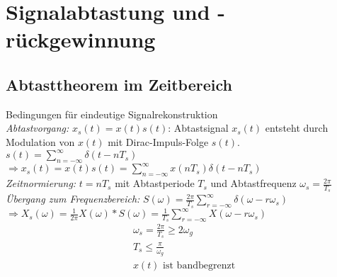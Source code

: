 \documentclass[german]{latex4ei/latex4ei_sheet}
\begin{document}
\section{Signalabtastung und -rückgewinnung}
\begin{sectionbox}
	\subsection{Abtasttheorem im Zeitbereich}
	Bedingungen für eindeutige Signalrekonstruktion\\
	\emph{Abtastvorgang:} \underline{$x_s(t) = x(t) s(t)$}: Abtastsignal $x_s(t)$ entsteht durch Modulation von $x(t)$ mit Dirac-Impuls-Folge $s(t)$.\\
	$s(t) = \sum\limits_{n=-\infty}^{\infty}{\delta(t - n T_s)}$\\
	$\Rightarrow x_s(t) = x(t) s(t) = \sum\limits_{n=-\infty}^{\infty}{x(n T_s) \delta(t - n T_s)}$\\
	\emph{Zeitnormierung:} $t = n T_s$ mit Abtastperiode $T_s$ und Abtastfrequenz $\omega_s = \frac{2 \pi}{T_s}$\\
	\emph{Übergang zum Frequenzbereich:} $S(\omega) = \frac{2 \pi}{T_s} \sum\limits_{r=-\infty}^{\infty}{\delta(\omega
	 - r \omega_s)}$\\
	$\Rightarrow X_s(\omega) = \frac{1}{2 \pi} X(\omega) \ast S(\omega) = \frac{1}{T_s} \sum\limits_{r=-\infty}^{\infty}{X(\omega - r \omega_s)}$
	\begin{align}
		\omega_s = \frac{2 \pi}{T_s} \geq 2 \omega_g\\
		T_s \leq \frac{\pi}{\omega_g}\\
		x(t) \text{ ist bandbegrenzt}
	\end{align}
\end{sectionbox}
\end{document}
